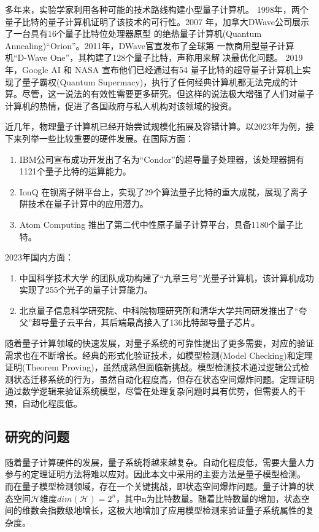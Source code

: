 多年来，实验学家利用各种可能的技术路线构建小型量子计算机。 1998年，两个量子比特的量子计算机证明了该技术的可行性\citep{chuang1998experimental}。2007
年，加拿大DWave公司展示了一台具有16个量子比特位处理器原型
的绝热量子计算机(Quantum Annealing)“Orion”。2011年，DWave官宣发布了全球第
一款商用型量子计算机“D-Wave One”，其构建了128个量子比特，声称用来解
决最优化问题。
2019 年，Google AI 和 NASA 宣布他们已经通过有54 量子比特的超导量子计算机上实现了量子霸权(Quantum Supermacy)，执行了任何经典计算机都无法完成的计算\citep{arute2019quantum}。尽管，这一说法的有效性需要更多研究\citep{pednault2019quantum}。但这样的说法极大增强了人们对量子计算机的热情，促进了各国政府与私人机构对该领域的投资。

近几年，物理量子计算机已经开始尝试规模化拓展及容错计算。以2023年为例，接下来列举一些比较重要的硬件发展。在国际方面：
\begin{enumerate}
    \item IBM公司宣布成功开发出了名为“Condor”的超导量子处理器，该处理器拥有1121个量子比特的运算能力。
    \item IonQ 在钡离子阱平台上，实现了29个算法量子比特的重大成就，展现了离子阱技术在量子计算中的应用潜力。
    \item Atom Computing 推出了第二代中性原子量子计算平台，具备1180个量子比特。
\end{enumerate}
2023年国内方面：
\begin{enumerate}
    \item 中国科学技术大学 的团队成功构建了“九章三号”光量子计算机，该计算机成功实现了255个光子的量子计算能力。
    \item 北京量子信息科学研究院、中科院物理研究所和清华大学共同研发推出了“夸父”超导量子云平台，其后端最高接入了136比特超导量子芯片。
\end{enumerate}

随着量子计算领域的快速发展，对量子系统的可靠性提出了更多需要，对应的验证需求也在不断增长。经典的形式化验证技术，如模型检测(Model Checking)和定理证明(Theorem Proving)，虽然成熟但面临新挑战。模型检测技术通过逻辑公式检测状态迁移系统的行为，虽然自动化程度高，但存在状态空间爆炸问题。定理证明通过数学逻辑来验证系统模型，尽管在处理复杂问题时具有优势，但需要人的干预，自动化程度低。
\subsection{研究的问题}
随着量子计算硬件的发展，量子系统将越来越复杂。自动化程度低，需要大量人力参与的定理证明方法将难以应对。因此本文中采用的主要方法是量子模型检测。
而在量子模型检测领域，存在一个关键挑战，即状态空间爆炸问题。量子计算的状态空间\(\mathcal{H}\)维度\(dim\left(\mathcal{H}\right)=2^n\)，其中n为比特数量。随着比特数量的增加，状态空间的维数会指数级地增长，这极大地增加了应用模型检测来验证量子系统属性的复杂度。

